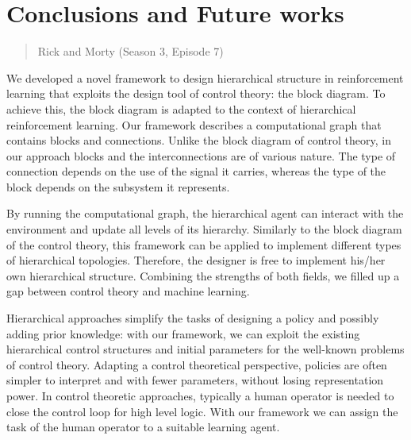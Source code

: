 \chapter{Conclusions and Future works}
\label{conclusions}
\thispagestyle{empty}

\begin{quotation}
{\footnotesize
{}
\begin{flushright}
Rick and Morty (Season 3, Episode 7)
\end{flushright}
}
\end{quotation}



\vspace{0.5cm}

We developed a novel framework to design hierarchical structure in reinforcement learning that exploits the design tool of control theory: the block diagram. To achieve this, the block diagram is adapted to the context of hierarchical reinforcement learning. Our framework describes a computational graph that contains blocks and connections. Unlike the block diagram of control theory, in our approach blocks and the interconnections are of various nature. The type of connection depends on the use of the signal it carries, whereas the type of the block depends on the subsystem it represents. 

By running the computational graph, the hierarchical agent can interact with the environment and update all levels of its hierarchy. Similarly to the block diagram of the control theory, this framework can be applied to implement different types of hierarchical topologies. Therefore, the designer is free to implement his/her own hierarchical structure. Combining the strengths of both fields, we filled up a gap between control theory and machine learning.

Hierarchical approaches simplify the tasks of designing a policy and possibly adding prior knowledge: with our framework, we can exploit the existing hierarchical control structures and initial parameters for the well-known problems of control theory. Adapting a control theoretical perspective, policies are often simpler to interpret and with fewer parameters, without losing representation power. In control theoretic approaches, typically a human operator is needed to close the control loop for high level logic. With our framework we can assign the task of the human operator to a suitable learning agent. 
  
